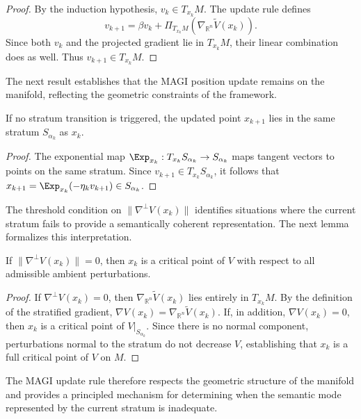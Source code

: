 \documentclass[12pt]{article}
\begin{document}
\begin{proof}
By the induction hypothesis, $v_k \in T_{x_k} M$. The update rule defines
\[
v_{k+1} = \beta v_k + \Pi_{T_{x_k} M}\left( \nabla_{\mathbb{R}^n} \widetilde{V}(x_k) \right).
\]
Since both $v_k$ and the projected gradient lie in $T_{x_k} M$, their linear combination does as well. Thus $v_{k+1} \in T_{x_k} M$.
\end{proof}

The next result establishes that the MAGI position update remains on the manifold, reflecting the geometric constraints of the framework.

\begin{lemma}
If no stratum transition is triggered, the updated point $x_{k+1}$ lies in the same stratum $S_{\alpha_k}$ as $x_k$.
\end{lemma}

\begin{proof}
The exponential map $\Exp_{x_k} : T_{x_k} S_{\alpha_k} \to S_{\alpha_k}$ maps tangent vectors to points on the same stratum. Since $v_{k+1} \in T_{x_k} S_{\alpha_k}$, it follows that $x_{k+1} = \Exp_{x_k}(-\eta_k v_{k+1}) \in S_{\alpha_k}$.
\end{proof}

The threshold condition on $\|\nabla^\perp V(x_k)\|$ identifies situations where the current stratum fails to provide a semantically coherent representation. The next lemma formalizes this interpretation.

\begin{lemma}
If $\|\nabla^\perp V(x_k)\| = 0$, then $x_k$ is a critical point of $V$ with respect to all admissible ambient perturbations.
\end{lemma}

\begin{proof}
If $\nabla^\perp V(x_k) = 0$, then $\nabla_{\mathbb{R}^n} \widetilde{V}(x_k)$ lies entirely in $T_{x_k} M$. By the definition of the stratified gradient, $\nabla V(x_k) = \nabla_{\mathbb{R}^n} \widetilde{V}(x_k)$. If, in addition, $\nabla V(x_k) = 0$, then $x_k$ is a critical point of $V|_{S_{\alpha_k}}$. Since there is no normal component, perturbations normal to the stratum do not decrease $V$, establishing that $x_k$ is a full critical point of $V$ on $M$.
\end{proof}

The MAGI update rule therefore respects the geometric structure of the manifold and provides a principled mechanism for determining when the semantic mode represented by the current stratum is inadequate.
\end{document}
